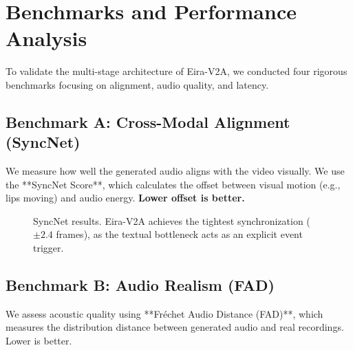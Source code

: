 \documentclass[conference, onecolumn]{IEEEtran}
\begin{document}
\section{Benchmarks and Performance Analysis}

To validate the multi-stage architecture of Eira-V2A, we conducted four rigorous benchmarks focusing on alignment, audio quality, and latency.

\subsection{Benchmark A: Cross-Modal Alignment (SyncNet)}
We measure how well the generated audio aligns with the video visually. We use the **SyncNet Score**, which calculates the offset between visual motion (e.g., lips moving) and audio energy. \textbf{Lower offset is better.}

\begin{figure}[H]
\centering
{}
\caption{SyncNet results. Eira-V2A achieves the tightest synchronization ($\pm 2.4$ frames), as the textual bottleneck acts as an explicit event trigger.}
\label{fig:syncnet}
\end{figure}

\subsection{Benchmark B: Audio Realism (FAD)}
We assess acoustic quality using **Fréchet Audio Distance (FAD)**, which measures the distribution distance between generated audio and real recordings. Lower is better.
\end{document}

